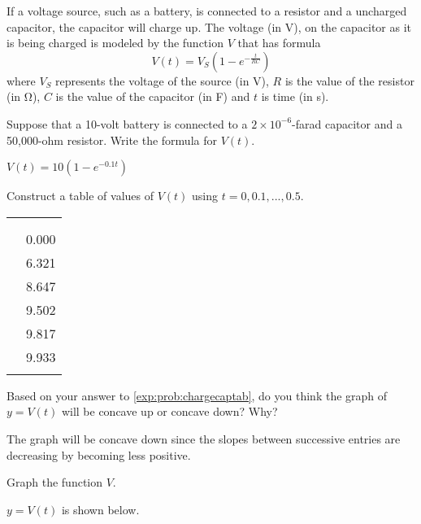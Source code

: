 \begin{exercises}
\begin{problem}
If a voltage source, such as a battery, is connected to a resistor and a uncharged
capacitor, the capacitor will charge up. The voltage (in \si{\volt}), 
on the capacitor as it is being charged is modeled by the function $V$ 
that has formula
\[
	V(t)=V_S\left( 1-e^{-\frac{t}{RC}} \right)
\]
where $V_S$ represents the voltage of the source (in \si{\volt}), $R$
is the value of the resistor (in \si{\ohm}), $C$ is the
value of the capacitor (in \si{\farad}) and $t$ is time (in \si{\second}).
\begin{subproblem}
	Suppose that a 10-volt battery is connected to a $2\times 10^{-6}$-farad capacitor 
	and a 50,000-ohm resistor.  Write the formula for $V(t)$.
	\begin{shortsolution}
		$V(t)=10( 1-e^{-0.1t} )$ 
	\end{shortsolution}
\end{subproblem}
\begin{subproblem}\label{exp:prob:chargecaptab}
	Construct a table of values of $V(t)$ using $t=0,0.1,...,0.5$.
	\begin{shortsolution}
		\begin{tabular}[t]{S[table-format=1.1]S[table-format=1.3]} 
			\beforeheading
			            &        \\
			\heading{(\si{\second})} & \heading{(\si{\volt})} \\
			                      & 0.000                  \\                        & 6.321                  \\                        & 8.647                  \\                        & 9.502                  \\                        & 9.817                  \\                        & 9.933                  \\  \lastline
		\end{tabular}
	\end{shortsolution}
\end{subproblem}
\begin{subproblem}
	Based on your answer to \cref{exp:prob:chargecaptab}, do you think the 
	graph of $y=V(t)$ will be concave up or concave down? Why?
	\begin{shortsolution}
		The graph will be concave down since the slopes between successive
		entries are decreasing by becoming less positive.
	\end{shortsolution}
\end{subproblem}
\begin{subproblem}
	Graph the function $V$.
	\begin{shortsolution}
		$y=V(t)$ is shown below.
																			

\end{shortsolution}
\end{subproblem}
\end{problem}
\end{exercises}
